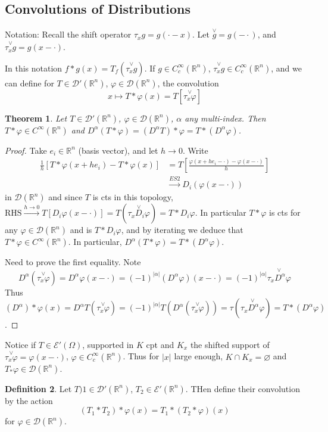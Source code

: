 \documentclass{article}
\theoremstyle{definition}
\newtheorem{defn}{Definition}[section]
\theoremstyle{remark}
\theoremstyle{plain}
\newtheorem{thm}[defn]{Theorem}
\newcommand{\RR}{\mathbb{R}}
\newcommand{\calD}{\mathcal{D}}
\begin{document}
\subsection{Convolutions of Distributions}
Notation: Recall the shift operator $\tau_xg=g(\cdot-x)$. Let $\overset{\vee}{g}=g(-\cdot)$, and $\overset{\vee}{\tau_xg}=g(x-\cdot)$.

In this notation $f\ast g(x)=T_f(\overset{\vee}{\tau_xg})$. If $g\in C^\infty_c(\RR^n)$, $\overset{\vee}{\tau_xg}\in C_c^\infty(\RR^n)$, and we can define for $T\in\calD'(\RR^n)$, $\varphi\in \calD(\RR^n)$, the convolution
\[x\mapsto T\ast\varphi(x)=T[\overset{\vee}{\tau_x\varphi}]\]
\begin{thm}
    Let $T\in\calD'(\RR^n)$, $\varphi\in\calD(\RR^n)$, $\alpha$ any multi-index. Then $T\ast\varphi\in C^\infty(\RR^n)$ and $D^\alpha(T\ast\varphi)=(D^\alpha T)\ast\varphi= T\ast(D^\alpha\varphi)$.
\end{thm}
\begin{proof}
    Take $e_i\in\RR^n$ (basis vector), and let $h\to 0$. Write \begin{align*}\frac1h[T\ast\varphi(x+he_i)-T\ast\varphi(x)]&=T\left[\frac{\varphi(x+he_i-\cdot)-\varphi(x-\cdot)}{h}\right]\\
    &\overset{ES2}{\longrightarrow} D_i(\varphi(x-\cdot))\end{align*}
     in $\calD(\RR^n)$ and since $T$ is cts in this topology, $\text{RHS}\overset{h\to 0}{\to} T[D_i\varphi(x-\cdot)]=T(\overset{\vee}{\tau_xD_i\varphi})=T\ast D_i\varphi$. In particular $T\ast \varphi$ is cts for any $\varphi\in\calD(\RR^n)$ and is $T\ast D_i\varphi$, and by iterating we deduce that $T\ast\varphi\in C^\infty(\RR^n)$. In particular, $D^\alpha (T\ast\varphi)=T\ast(D^\alpha\varphi)$.

     Need to prove the first equality. Note 
     \[D^\alpha(\overset{\vee}{\tau_x\varphi})=D^\alpha\varphi(x-\cdot)=(-1)^{|\alpha|}(D^\alpha\varphi)(x-\cdot)=(-1)^{|\alpha|}\overset{\vee}{\tau_xD^\alpha\varphi}\]
     Thus $(D^\alpha)\ast\varphi(x)\overset{}{=}D^\alpha T(\overset{\vee}{\tau_x\varphi})=(-1)^{|\alpha|}T(D^\alpha(\overset{\vee}{\tau_x\varphi}))=\tau(\overset{\vee}{\tau_xD^\alpha\varphi})=T\ast(D^\alpha\varphi)$.
\end{proof}
Notice if $T\in\mathcal E'(\Omega)$, supported in $K$ cpt and $K_x$ the shifted support of $\overset{\vee}{\tau_x\varphi}=\varphi(x-\cdot)$, $\varphi\in C_c^\infty(\RR^n)$. Thus for $|x|$ large enough, $K\cap K_x=\varnothing$ and $T_\ast\varphi\in\calD(\RR^n)$.
\begin{defn}
    Let $T)1\in\calD'(\RR^n)$, $T_2\in\mathcal E'(\RR^n)$. THen define their convolution by the action
    \[(T_1\ast T_2)\ast\varphi(x)=T_1\ast(T_2\ast\varphi)(x)\] for $\varphi\in \calD(\RR^n)$.
\end{defn}
\end{document}
